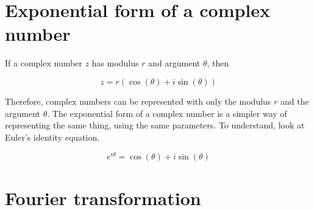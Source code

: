 \documentclass{article}
\begin{document}
    \section{Exponential form of a complex number}
    If a complex number $z$ has modulus $r$ and argument $\theta$, then

    \[z=r(\cos(\theta) + i \sin(\theta))\]

    Therefore, complex numbers can be represented with only the modulus $r$ and the argument $\theta$. The
    exponential form of a complex number is a simpler way of representing the same thing, using the same
    parameters. To understand, look at Euler's identity equation.

    \[e^{i\theta} = \cos(\theta) + i \sin(\theta) \]

    \section{Fourier transformation}
\end{document}
